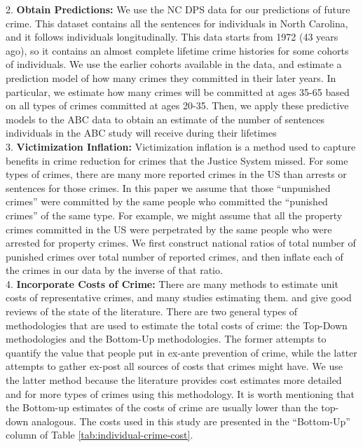 \documentclass[11pt]{amsart}
\begin{document}
2. \textbf{Obtain Predictions:} We use the NC DPS data for our predictions of future crime. This dataset contains all the sentences for individuals in North Carolina, and it follows individuals longitudinally. This data starts from 1972 (43 years ago), so it contains an almost complete lifetime crime histories for some cohorts of individuals. We use the earlier cohorts available in the data, and estimate a prediction model of how many crimes they committed in their later years. In particular, we estimate how many crimes will be committed at ages 35-65 based on all types of crimes committed at ages 20-35. Then, we apply these predictive models to the ABC data to obtain an estimate of the number of sentences individuals in the ABC study will receive during their lifetimes\\

3. \textbf{Victimization Inflation:} Victimization inflation is a method used to capture benefits in crime reduction for crimes that the Justice System missed. For some types of crimes, there are many more reported crimes in the US than arrests or sentences for those crimes. In this paper we assume that those ``unpunished crimes'' were committed by the same people who committed the ``punished crimes'' of the same type. For example, we might assume that all the property crimes committed in the US were perpetrated by the same people who were arrested for property crimes. We first construct national ratios of total number of punished crimes over total number of reported crimes, and then inflate each of the crimes in our data by the inverse of that ratio.\\

4. \textbf{Incorporate Costs of Crime:} There are many methods to estimate unit costs of representative crimes, and many studies estimating them. \cite{cohen2010estimating} and \cite{mccollister2010cost} give good reviews of the state of the literature. There are two general types of methodologies that are used to estimate the total costs of crime: the Top-Down methodologies and the Bottom-Up methodologies. The former attempts to quantify the value that people put in ex-ante prevention of crime, while the latter attempts to gather ex-post all sources of costs that crimes might have. We use the latter method because the literature provides cost estimates more detailed and for more types of crimes using this methodology. It is worth mentioning that the Bottom-up estimates of the costs of crime are usually lower than the top-down analogous. The costs used in this study are presented in the ``Bottom-Up'' column of Table \ref{tab:individual-crime-cost}. \\
\end{document}
